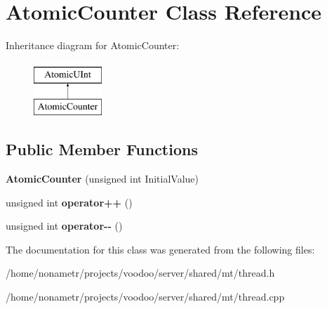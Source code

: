 \hypertarget{classAtomicCounter}{\section{\-Atomic\-Counter \-Class \-Reference}
\label{classAtomicCounter}
}
\-Inheritance diagram for \-Atomic\-Counter\-:\begin{figure}[H]
\begin{center}
\leavevmode
\includegraphics[height=2.000000cm]{classAtomicCounter}
\end{center}
\end{figure}
\subsection*{\-Public \-Member \-Functions}
\begin{DoxyCompactItemize}
\item 
\hypertarget{classAtomicCounter_a7ac0a9d0ea94c1d44085643b013e6691}{{\bfseries \-Atomic\-Counter} (unsigned int \-Initial\-Value)}\label{classAtomicCounter_a7ac0a9d0ea94c1d44085643b013e6691}

\item 
\hypertarget{classAtomicCounter_a67e47216267c256c7236b2612969a2b1}{unsigned int {\bfseries operator++} ()}\label{classAtomicCounter_a67e47216267c256c7236b2612969a2b1}

\item 
\hypertarget{classAtomicCounter_a464033cba228a18de3b93344b131a638}{unsigned int {\bfseries operator-\/-\/} ()}\label{classAtomicCounter_a464033cba228a18de3b93344b131a638}

\end{DoxyCompactItemize}


\-The documentation for this class was generated from the following files\-:\begin{DoxyCompactItemize}
\item 
/home/nonametr/projects/voodoo/server/shared/mt/thread.\-h\item 
/home/nonametr/projects/voodoo/server/shared/mt/thread.\-cpp\end{DoxyCompactItemize}
